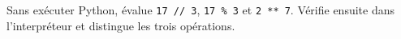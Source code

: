 Sans exécuter Python, évalue \texttt{17 // 3}, \texttt{17 \% 3} et \texttt{2 ** 7}. Vérifie ensuite dans l'interpréteur et distingue les trois opérations.
